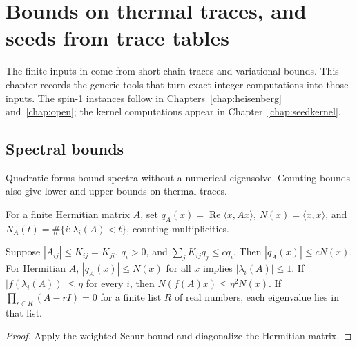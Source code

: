 \chapter{Bounds on thermal traces, and seeds from trace tables}
\label{chap:traces}

The finite inputs in \cite{OpenAIHaldane, OpenAIBoundary} come from short-chain traces and
variational bounds. This chapter records the generic tools that turn exact integer computations
into those inputs. The spin-1 instances follow in Chapters~\ref{chap:heisenberg}
and~\ref{chap:open}; the kernel computations appear in Chapter~\ref{chap:seedkernel}.

\section{Spectral bounds}

Quadratic forms bound spectra without a numerical eigensolve.
Counting bounds also give lower and upper bounds on thermal traces.

\begin{definition}
  \label{def:spectral-forms}
  \leanok
  For a finite Hermitian matrix \(A\), set
  \(q_A(x)=\operatorname{Re}\langle x,Ax\rangle\), \(N(x)=\langle x,x\rangle\), and
  \(N_A(t)=\#\{i:\lambda_i(A)<t\}\), counting multiplicities.
\end{definition}

\begin{lemma}
  \label{lem:spectral-calculus}
  \leanok
  Suppose \(|A_{ij}|\le K_{ij}=K_{ji}\), \(q_i>0\), and
  \(\sum_j K_{ij}q_j\le c q_i\). Then \(|q_A(x)|\le cN(x)\).
  For Hermitian \(A\), \(|q_A(x)|\le N(x)\) for all \(x\) implies
  \(|\lambda_i(A)|\le1\). If \(|f(\lambda_i(A))|\le\eta\) for every \(i\), then
  \(N(f(A)x)\le\eta^2N(x)\).
  If \(\prod_{r\in R}(A-rI)=0\) for a finite list \(R\) of real numbers, each eigenvalue lies in
  that list.
\end{lemma}
\begin{proof}
  \leanok
  Apply the weighted Schur bound and diagonalize the Hermitian matrix.
\end{proof}

